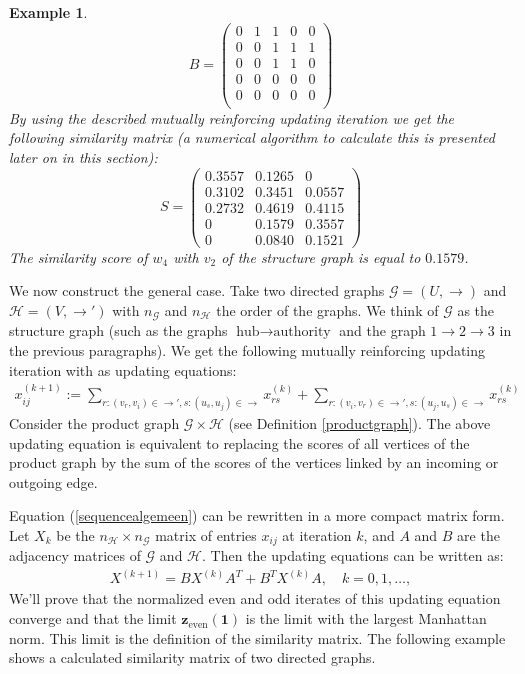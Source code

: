 \documentclass[a4paper,11pt]{report}
\newtheorem{example}[theorem]{Example}
\newcommand{\graf}{\mathscr{G}}
\newcommand{\grafeen}{\mathscr{H}}
\begin{document}
\begin{example}
$$B = \begin{pmatrix}
0 & 1 & 1 & 0 & 0\\
0 & 0 & 1 & 1 & 1\\
0 & 0 & 1 & 1 & 0\\
0 & 0 & 0 & 0 & 0\\
0 & 0 & 0 & 0 & 0\\
\end{pmatrix}$$
 By using the described mutually reinforcing updating iteration we get the 
 following similarity matrix (a numerical algorithm to calculate this is presented later 
 on in this section):
 $$ S = \begin{pmatrix}
 0.3557 & 0.1265 & 0\\
 0.3102 & 0.3451  & 0.0557\\
 0.2732 & 0.4619 & 0.4115\\
0 & 0.1579 & 0.3557\\
 0 & 0.0840 & 0.1521
\end{pmatrix}$$
The similarity score of $w_4$ with $v_2$ of the structure graph is equal to 
$0.1579$.
 \end{example}

 We now construct the general case. Take two directed graphs $\graf=(U, \to)$ and $\grafeen=(V, \to')$ 
 with $n_\graf$ and $n_\grafeen$ the order of the graphs. We think of $\graf$ as the structure 
 graph (such as the graphs $\text{hub}\to \text{authority}$ and the graph $1\to 2\to 
 3$ in the previous paragraphs). We get the following mutually reinforcing updating iteration with as updating equations:
 \begin{eqnarray}\label{vergblondel}
 x^{(k+1)}_{ij} := \sum_{r:(v_r,v_i)\in \to', s:(u_s,u_j) \in \to} x^{(k)}_{rs} +  \sum_{r:(v_i,v_r)\in \to', s:(u_j,u_s) \in \to} x^{(k)}_{rs} 
 \end{eqnarray}
 Consider the product graph $\graf \times \grafeen$ (see Definition \ref{productgraph}). The above updating equation is equivalent to replacing
 the scores of all vertices of the product graph by the sum of the scores of the vertices linked by an incoming
 or outgoing edge. 
 
 Equation (\ref{sequencealgemeen}) can be rewritten in a more compact matrix form. Let $X_k$
 be the $n_\grafeen \times n_\graf$ matrix of entries $x_{ij}$ at iteration $k$, and $A$ and $B$ are the adjacency matrices
 of $\graf$ and $\grafeen$. Then the 
 updating equations can be written as:
 \begin{eqnarray}\label{compacteforms}
X^{(k+1)} = BX^{(k)}A^T + B^TX^{(k)}A,\quad k=0,1,\ldots,
  \end{eqnarray}
We'll prove that the normalized even and odd iterates of 
 this updating equation converge and that the limit $\mathbf{z}_{\text{even}}(\mathbf{1})$ 
 is the limit with the largest Manhattan norm. This limit is the definition of 
 the similarity matrix. The following example shows a calculated similarity 
 matrix of two directed graphs.
 
\end{document}
